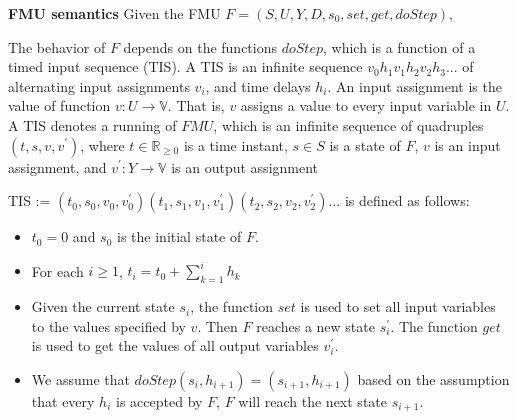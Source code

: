 \begin{definition}
\textbf{FMU semantics}
Given the FMU $F=(S,U,Y,D,s_{0},set,get,doStep)$,
\end{definition} 
The behavior of $F$ depends on the functions $doStep$, which is a function of a timed input sequence (TIS). A TIS is an infinite sequence 
$v_{0}h_{1}v_{1}h_{2}v_{2}h_{3}...$
of alternating input assignments $v_{i}$, and time delays $h_{i}$. An input assignment is the value of function $v : U \rightarrow \mathbb{V}$. That is, $v$ assigns a value to every input variable in $U$.
A TIS denotes a running of $FMU$, which is an infinite sequence of quadruples $(t,s,v,v^{\prime})$, where $t \in \mathbb{R}_{\geqslant{0}}$ is a time instant, $s \in S$ is a state of $F$, $v$ is an input assignment, and $v^{\prime} : Y \rightarrow \mathbb{V}$ is an output assignment
 
TIS := $(t_{0},s_{0},v_{0},v_{0}^{\prime})(t_{1},s_{1},v_{1},v_{1}^{\prime})(t_{2},s_{2},v_{2},v_{2}^{\prime})...$ is
defined as follows:
\begin{itemize}
\item
$t_{0} = 0$ and $s_{0}$ is the initial state of $F$.
\item
For each $i \geqslant 1$, $t_{i} = t_{0} + \sum_{k = 1}^i h_{k}$
\item
Given the current state $s_{i}$, the function $set$ is used to set all input variables to the values specified by $v$. Then $F$ reaches a new state $s_{i}^{\prime}$. The function $get$ is used to get the values of all output variables $v_{i}^{\prime}$.
\item 
We assume that $doStep(s_{i}, h_{i+1}) = (s_{i+1},h_{i+1})$ based on the assumption that every $h_{i}$ is accepted by $F$, $F$ will reach the next state $s_{i+1}$.
\end{itemize}
